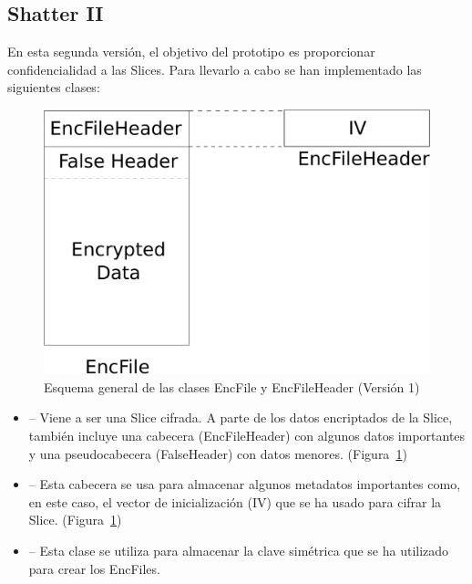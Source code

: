 
\subsection{Shatter II}

En esta segunda versión, el objetivo del prototipo es proporcionar
confidencialidad a las Slices. Para llevarlo a cabo se han implementado las
siguientes clases:

\begin{figure}[ht]
  \centering
  \includegraphics[scale=0.4]{Figures/EncFile_Header_1}
  \decoRule
  \caption[EncFile - EncFileHeader (Versión 1)]{Esquema general de las clases EncFile y EncFileHeader (Versión 1)}
  \label{fig:EncFile_Header_1}
\end{figure}

\begin{itemize}
  \item {} -- Viene a ser una Slice cifrada. A parte de los datos
  encriptados de la Slice, también incluye una cabecera (EncFileHeader) con
  algunos datos importantes y una pseudocabecera (FalseHeader) con datos menores.
  (Figura~\ref{fig:EncFile_Header_1})

  \item {} -- Esta cabecera se usa para almacenar algunos
  metadatos importantes como, en este caso, el vector de inicialización (IV)
  que se ha usado para cifrar la Slice. (Figura~\ref{fig:EncFile_Header_1})

  \item {} -- Esta clase se utiliza para almacenar la clave
  simétrica que se ha utilizado para crear los EncFiles.
\end{itemize}

